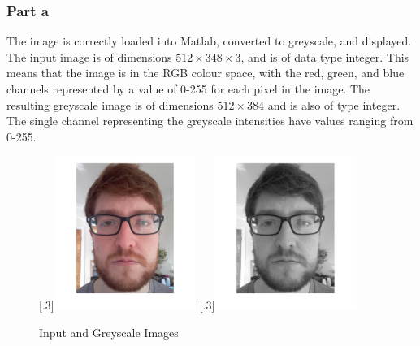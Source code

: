 \documentclass[a4paper]{article}
\begin{document}
	\subsubsection{Part a}
	The image is correctly loaded into Matlab, converted to greyscale, and
	displayed. The input image is of dimensions $512\times 348\times 3$, and
	is of data type integer. This means that the image is in the RGB colour
	space, with the red, green, and blue channels represented by a value of
	0-255 for each pixel in the image. The resulting greyscale image is of
	dimensions  $512\times 384$ and is also of type integer. The single
	channel representing the greyscale intensities have values ranging from
	0-255.
	\begin{figure}[H]
		\centering
		[.3\linewidth]{\includegraphics[height=5cm]{Results/Q1/a/qaInput.jpg}}%
		[.3\linewidth]{\includegraphics[height=5cm]{Results/Q1/a/qaGreyscale.jpg}}%
		\caption{Input and Greyscale Images}
		\label{fig:}
	\end{figure}
\end{document}
